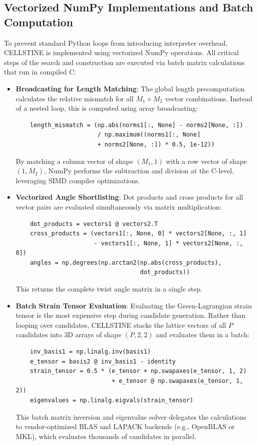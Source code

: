 \documentclass[9pt,a4paper,twoside]{tau-class/tau}
\begin{document}
\subsection{Vectorized NumPy Implementations and Batch Computation}
To prevent standard Python loops from introducing interpreter overhead, CELLSTINE is implemented using vectorized NumPy operations. All critical steps of the search and construction are executed via batch matrix calculations that run in compiled C:
\begin{itemize}[leftmargin=*]
    \item \textbf{Broadcasting for Length Matching}: The global length precomputation calculates the relative mismatch for all $M_1 \times M_2$ vector combinations. Instead of a nested loop, this is computed using array broadcasting:
    \begin{verbatim}
    length_mismatch = (np.abs(norms1[:, None] - norms2[None, :]) 
                       / np.maximum((norms1[:, None] 
                       + norms2[None, :]) * 0.5, 1e-12))
    \end{verbatim}
    By matching a column vector of shape $(M_1, 1)$ with a row vector of shape $(1, M_2)$, NumPy performs the subtraction and division at the C-level, leveraging SIMD compiler optimizations.
    
    \item \textbf{Vectorized Angle Shortlisting}: Dot products and cross products for all vector pairs are evaluated simultaneously via matrix multiplication:
    \begin{verbatim}
    dot_products = vectors1 @ vectors2.T
    cross_products = (vectors1[:, None, 0] * vectors2[None, :, 1] 
                      - vectors1[:, None, 1] * vectors2[None, :, 0])
    angles = np.degrees(np.arctan2(np.abs(cross_products), 
                                   dot_products))
    \end{verbatim}
    This returns the complete twist angle matrix in a single step.
    
    \item \textbf{Batch Strain Tensor Evaluation}: Evaluating the Green-Lagrangian strain tensor is the most expensive step during candidate generation. Rather than looping over candidates, CELLSTINE stacks the lattice vectors of all $P$ candidates into 3D arrays of shape $(P, 2, 2)$ and evaluates them in a batch:
    \begin{verbatim}
    inv_basis1 = np.linalg.inv(basis1)
    e_tensor = basis2 @ inv_basis1 - identity
    strain_tensor = 0.5 * (e_tensor + np.swapaxes(e_tensor, 1, 2) 
                           + e_tensor @ np.swapaxes(e_tensor, 1, 2))
    eigenvalues = np.linalg.eigvals(strain_tensor)
    \end{verbatim}
    This batch matrix inversion and eigenvalue solver delegates the calculations to vendor-optimized BLAS and LAPACK backends (e.g., OpenBLAS or MKL), which evaluates thousands of candidates in parallel.
\end{itemize}
\end{document}
